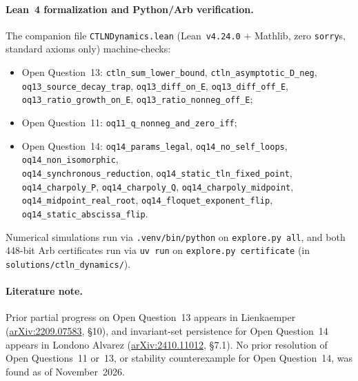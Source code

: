 \documentclass[11pt]{article}
\theoremstyle{plain}
\theoremstyle{definition}
\theoremstyle{remark}
\begin{document}
\paragraph{Lean~4 formalization and Python/Arb verification.}
The companion file \texttt{CTLNDynamics.lean} (Lean~\texttt{v4.24.0} + Mathlib, zero \texttt{sorry}s, standard axioms only) machine-checks:
\begin{itemize}[leftmargin=2em,itemsep=1pt,topsep=3pt]
\item Open Question~13: \texttt{ctln\_sum\_lower\_bound}, \texttt{ctln\_asymptotic\_D\_neg},\\
\texttt{oq13\_source\_decay\_trap}, \texttt{oq13\_diff\_on\_E}, \texttt{oq13\_diff\_off\_E},\\
\texttt{oq13\_ratio\_growth\_on\_E}, \texttt{oq13\_ratio\_nonneg\_off\_E};
\item Open Question~11: \texttt{oq11\_q\_nonneg\_and\_zero\_iff};
\item Open Question~14: \texttt{oq14\_params\_legal}, \texttt{oq14\_no\_self\_loops}, \texttt{oq14\_non\_isomorphic},\\
\texttt{oq14\_synchronous\_reduction}, \texttt{oq14\_static\_tln\_fixed\_point},\\
\texttt{oq14\_charpoly\_P}, \texttt{oq14\_charpoly\_Q}, \texttt{oq14\_charpoly\_midpoint},\\
\texttt{oq14\_midpoint\_real\_root}, \texttt{oq14\_floquet\_exponent\_flip},\\
\texttt{oq14\_static\_abscissa\_flip}.
\end{itemize}
Numerical simulations run via \texttt{.venv/bin/python} on \texttt{explore.py all}, and both 448-bit Arb certificates run via \texttt{uv run} on \texttt{explore.py certificate} (in \texttt{solutions/ctln\_dynamics/}).

\paragraph{Literature note.}
Prior partial progress on Open Question~13 appears in Lienkaemper (\href{https://arxiv.org/abs/2209.07583}{arXiv:2209.07583}, \S10), and invariant-set persistence for Open Question~14 appears in Londono Alvarez (\href{https://arxiv.org/abs/2410.11012}{arXiv:2410.11012}, \S7.1). No prior resolution of Open Questions~11 or~13, or stability counterexample for Open Question~14, was found as of November~2026.
\end{document}
